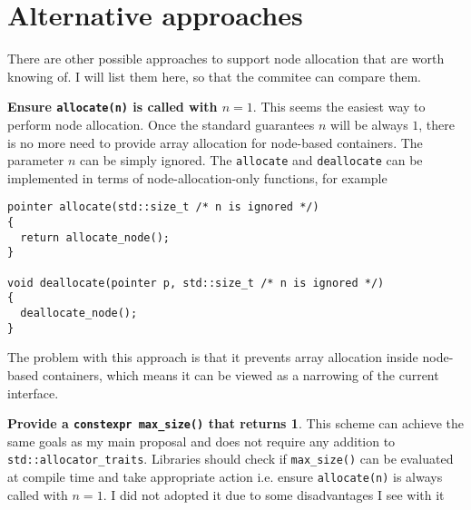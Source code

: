 \documentclass[11pt]{article}
\begin{document}
\appendix

\section{Alternative approaches} \label{alternative}

There are other possible approaches to support node allocation that are worth knowing
of.  I will list them here, so that the commitee can compare them.

\medskip
\noindent
{\bf Ensure \texttt{allocate(n)} is called with $n = 1$}. This seems the easiest
way to perform node allocation. Once the standard guarantees $n$ will be always $1$,
there is no more need to provide array allocation for node-based containers. The
parameter $n$ can be simply ignored. The \texttt{allocate} and \texttt{deallocate}
can be implemented in terms of node-allocation-only functions, for example
\medskip
\begin{lstlisting}
pointer allocate(std::size_t /* n is ignored */)
{
  return allocate_node();
}

void deallocate(pointer p, std::size_t /* n is ignored */)
{
  deallocate_node();
}
\end{lstlisting}

The problem with this approach is that it prevents array allocation inside
node-based containers, which means it can be viewed as a narrowing of the
current interface.

\medskip
\noindent
{\bf Provide a \texttt{constexpr max\_size()} that returns 1}. This scheme
can achieve the same goals as my main proposal and does not require any
addition to \texttt{std::allocator\_traits}. Libraries should check if
\texttt{max\_size()} can be evaluated at compile time and take appropriate
action i.e. ensure \texttt{allocate(n)} is always called with $n = 1$.
I did not adopted it due to some disadvantages I see with it
\end{document}
